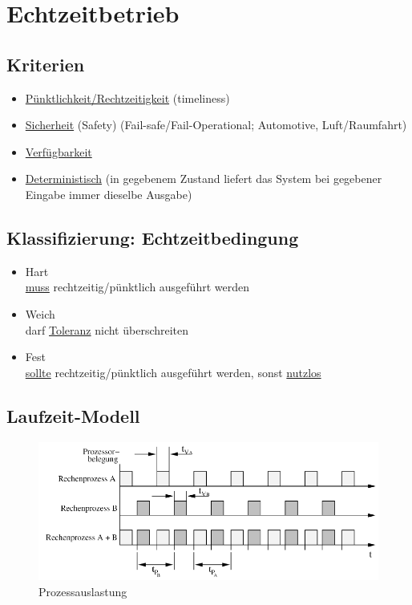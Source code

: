 \section{Echtzeitbetrieb}

\subsection{Kriterien}
\begin{itemize}
	\item \underline{Pünktlichkeit/Rechtzeitigkeit} (timeliness)
	\item \underline{Sicherheit} (Safety) (Fail-safe/Fail-Operational; Automotive, Luft/Raumfahrt)
	\item \underline{Verfügbarkeit}
	\item \underline{Deterministisch} (in gegebenem Zustand liefert das System bei gegebener Eingabe immer dieselbe Ausgabe)
\end{itemize}

\subsection{Klassifizierung: Echtzeitbedingung}
\begin{itemize}
	\item Hart \\
	\underline{muss} rechtzeitig/pünktlich ausgeführt werden
	
	\item Weich \\
	darf \underline{Toleranz} nicht überschreiten
	
	\item Fest \\
	\underline{sollte} rechtzeitig/pünktlich ausgeführt werden, sonst \underline{nutzlos}
\end{itemize}

\subsection{Laufzeit-Modell}
\begin{figure}[h!]
	\begin{center}
		\includegraphics[width=.75\linewidth]{pics/laufzeit}
		\caption{Prozessauslastung}
	\end{center}
\end{figure}

